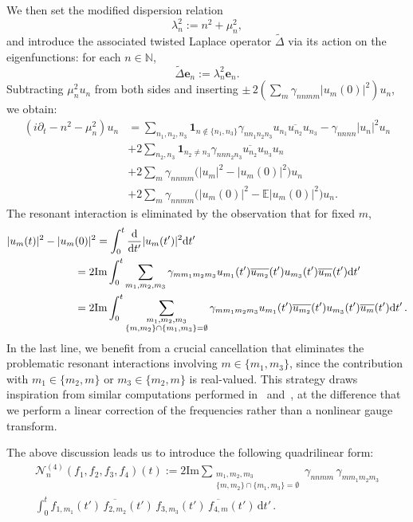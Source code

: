 \documentclass[11pt,reqno,english]{amsart}
\numberwithin{equation}{section}
\theoremstyle{plain}
\theoremstyle{definition}
\theoremstyle{remark}
\def\Im{\textrm{Im}}
\begin{document}
We then set the modified dispersion relation
\[
\lambda_n^2 := n^2 + \mu_n^2,
\]
and introduce the associated twisted Laplace operator $\widetilde{\Delta}$ via its action on the eigenfunctions: for each $n \in \mathbb{N}$,
\[
\widetilde{\Delta} \mathbf{e}_n := \lambda_n^2 \mathbf{e}_n.
\]
Subtracting $\mu_n^2 u_n$ from both sides and inserting $\pm\, 2(\sum_m \gamma_{nnmm} |u_m(0)|^2) u_n$, we obtain:
\begin{align*}
	(i\partial_{t}-n^2-\mu_{n}^{2})u_{n}
	&=
	\sum_{n_{1},n_{2},n_{3}}
	\mathbf{1}_{n\notin \{n_{1},n_{3}\}}
	\gamma_{nn_{1}n_{2}n_{3}}
	u_{n_{1}}
	\overline{u_{n_{2}}}u_{n_{3}}
	- \gamma_{nnnn}|u_{n}|^{2}u_{n}
	\\
	&+2
	\sum_{n_{2},n_{3}}\mathbf{1}_{n_{2}\neq n_{3}}
	\gamma_{nnn_{2}n_{3}}
	\overline{u_{n_{2}}}u_{n_{3}}
	u_{n} \\
	&+
	2
	\sum_{m}\gamma_{nnmm}
	\big(
	|u_{m}|^{2}-|u_{m}(0)|^{2}
	\big)
	u_{n} \\
	&+
	2
	\sum_{m}\gamma_{nnmm}
	\big(
	|u_{m}(0)|^{2}-\mathbb{E}|u_{m}(0)|^{2}
	\big)
	u_{n}.
\end{align*}
The resonant interaction is eliminated by the observation that for fixed $m$,
\begin{align*}
	|u_{m}(t)|^{2} - |u_{m}(0)|^{2}
	&=
	\int_{0}^{t}\frac{\mathrm{d}}{\mathrm{d}t'}|u_{m}(t')|^{2}\mathrm{d}t'\\
	&\hspace{-20pt}=2\Im
	\int_{0}^{t}\sum_{m_{1},m_{2},m_{3}}
	\gamma_{mm_{1}m_{2}m_{3}}
	u_{m_{1}}(t')\overline{u_{m_{2}}}(t')u_{m_{3}}(t')\overline{u_{m}}(t')
	\mathrm{d}t'
	\\
	&\hspace{-20pt}=2\Im
	\int_{0}^{t}\sum_{\substack{m_{1},m_{2},m_{3}\\ \{m,m_2\}\cap\{m_1,m_3\}=\emptyset}}
	\gamma_{mm_{1}m_{2}m_{3}}
	u_{m_{1}}(t')\overline{u_{m_{2}}}(t')u_{m_{3}}(t')\overline{u_{m}}(t')
	\mathrm{d}t'\,.
\end{align*}
In the last line, we benefit from a crucial cancellation that eliminates the problematic resonant interactions involving $m\in\{m_{1},m_{3}\}$, since the contribution with $m_1\in\{m_2,m\}$ or $m_3\in\{m_2,m\}$ is real-valued. This strategy draws inspiration from similar computations performed in~\cite{OTW20} and~\cite{Tsutsumi}, at the difference that we perform a linear correction of the frequencies rather than a nonlinear gauge transform.

The above discussion leads us to introduce the following quadrilinear form:
\begin{multline}
	\label{eq:N4}
	\mathcal{N}_n^{(4)}(f_1, f_{2}, f_{3}, f_{4})(t)
	:=
	2\Im \sum_{\substack{m_{1},m_{2},m_{3}\\
			\{m,m_2\}\cap\{m_1,m_3\}=\emptyset
	}}
	\gamma_{nnmm} \, \gamma_{mm_1m_2m_3}
	\\
	\int_0^t f_{1,m_1}(t') \, \overline{f_{2,m_2}}(t') \, f_{3,m_3}(t') \, \overline{f_{4,m}}(t') \, \mathrm{d}t'\,.
\end{multline}
\end{document}

